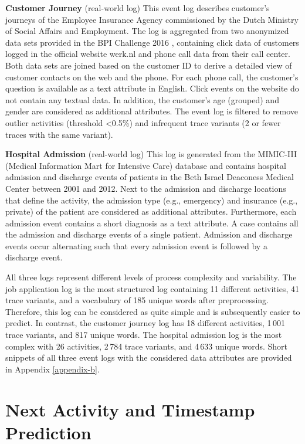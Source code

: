 \textbf{Customer Journey} (real-world log) This event log describes customer's journeys of the Employee Insurance Agency commissioned by the Dutch Ministry of Social Affairs and Employment.
The log is aggregated from two anonymized data sets provided in the BPI Challenge 2016 \cite{bpichallenge2016}, containing click data of customers logged in the official website werk.nl and phone call data from their call center.
Both data sets are joined based on the customer ID to derive a detailed view of customer contacts on the web and the phone.
For each phone call, the customer’s question is available as a text attribute in English.
Click events on the website do not contain any textual data.
In addition, the customer’s age (grouped) and gender are considered as additional attributes.
The event log is filtered to remove outlier activities (threshold <0.5\%) and infrequent trace variants (2 or fewer traces with the same variant).

\textbf{Hospital Admission} (real-world log) This log is generated from the MIMIC-III (Medical Information Mart for Intensive Care) database \cite{johnson2016mimic} and contains hospital admission and discharge events of patients in the Beth Israel Deaconess Medical Center between 2001 and 2012.
Next to the admission and discharge locations that define the activity, the admission type (e.g., emergency) and insurance (e.g., private) of the patient are considered as additional attributes.
Furthermore, each admission event contains a short diagnosis as a text attribute.
A case contains all the admission and discharge events of a single patient.
Admission and discharge events occur alternating such that every admission event is followed by a discharge event.

All three logs represent different levels of process complexity and variability.
The job application log is the most structured log containing 11 different activities, 41 trace variants, and a vocabulary of 185 unique words after preprocessing.
Therefore, this log can be considered as quite simple and is subsequently easier to predict.
In contrast, the customer journey log has 18 different activities, 1\,001 trace variants, and 817 unique words.
The hospital admission log is the most complex with 26 activities, 2\,784 trace variants, and 4\,633 unique words.
Short snippets of all three event logs with the considered data attributes are provided in Appendix \ref{appendix-b}.

\section{Next Activity and Timestamp Prediction}

